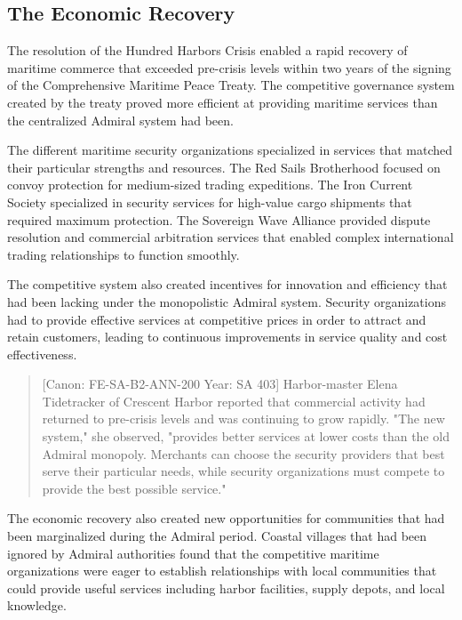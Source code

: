 \subsection{The Economic Recovery}\label{the-economic-recovery}

The resolution of the Hundred Harbors Crisis enabled a rapid recovery of
maritime commerce that exceeded pre-crisis levels within two years of
the signing of the Comprehensive Maritime Peace Treaty. The competitive
governance system created by the treaty proved more efficient at
providing maritime services than the centralized Admiral system had
been.

The different maritime security organizations specialized in services
that matched their particular strengths and resources. The Red Sails
Brotherhood focused on convoy protection for medium-sized trading
expeditions. The Iron Current Society specialized in security services
for high-value cargo shipments that required maximum protection. The
Sovereign Wave Alliance provided dispute resolution and commercial
arbitration services that enabled complex international trading
relationships to function smoothly.

The competitive system also created incentives for innovation and
efficiency that had been lacking under the monopolistic Admiral system.
Security organizations had to provide effective services at competitive
prices in order to attract and retain customers, leading to continuous
improvements in service quality and cost effectiveness.

\begin{quote}
{[}Canon: FE-SA-B2-ANN-200 \textbar{} Year: SA 403{]} Harbor-master
Elena Tidetracker of Crescent Harbor reported that commercial activity
had returned to pre-crisis levels and was continuing to grow rapidly.
"The new system," she observed, "provides better services at lower costs
than the old Admiral monopoly. Merchants can choose the security
providers that best serve their particular needs, while security
organizations must compete to provide the best possible service."
\end{quote}

The economic recovery also created new opportunities for communities
that had been marginalized during the Admiral period. Coastal villages
that had been ignored by Admiral authorities found that the competitive
maritime organizations were eager to establish relationships with local
communities that could provide useful services including harbor
facilities, supply depots, and local knowledge.

